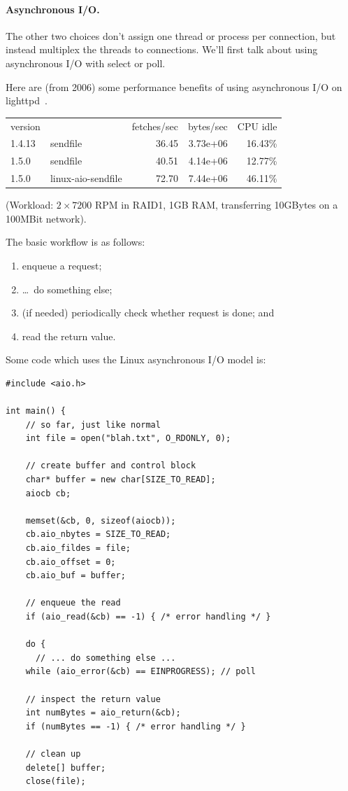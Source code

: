 \paragraph{Asynchronous I/O.} The other two choices don't assign one thread or process per connection,
but instead multiplex the threads to connections. We'll first talk
about using asynchronous I/O with select or poll.  

Here are (from 2006) some performance benefits of using asynchronous
I/O on lighttpd~\cite{lttpd}.

    \begin{tabular}{llrrr}
    version & & fetches/sec & bytes/sec & CPU idle \\
    1.4.13 & sendfile & 36.45 & 3.73e+06 & 16.43\% \\
    1.5.0 & sendfile & 40.51 & 4.14e+06 & 12.77\% \\
    1.5.0 & linux-aio-sendfile & 72.70 & 7.44e+06 & 46.11\% \\
    \end{tabular}

(Workload: $2\times 7200$ RPM in RAID1, 1GB RAM, transferring 10GBytes on a 100MBit network).

The basic workflow is as follows: 
   \begin{enumerate}
     \item enqueue a request;
     \item \ldots ~do something else;
     \item (if needed) periodically check whether request is done; and
     \item read the return value.
   \end{enumerate}

Some code which uses the Linux asynchronous I/O model is:
\begin{verbatim}
#include <aio.h>

int main() {
    // so far, just like normal
    int file = open("blah.txt", O_RDONLY, 0);

    // create buffer and control block
    char* buffer = new char[SIZE_TO_READ];
    aiocb cb;
    
    memset(&cb, 0, sizeof(aiocb));
    cb.aio_nbytes = SIZE_TO_READ;
    cb.aio_fildes = file;
    cb.aio_offset = 0;
    cb.aio_buf = buffer;

    // enqueue the read
    if (aio_read(&cb) == -1) { /* error handling */ }

    do {
      // ... do something else ...
    while (aio_error(&cb) == EINPROGRESS); // poll

    // inspect the return value
    int numBytes = aio_return(&cb);
    if (numBytes == -1) { /* error handling */ }

    // clean up
    delete[] buffer;
    close(file);
\end{verbatim}

